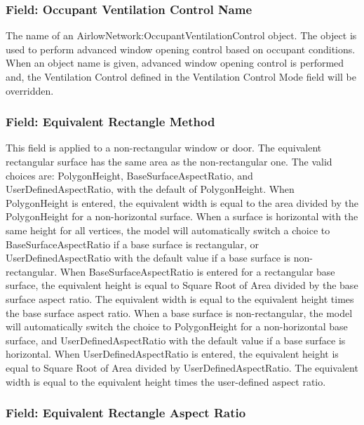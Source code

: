 \subsubsection{Field: Occupant Ventilation Control Name}\label{field-occupant-ventilation-control-name-1}

The name of an AirlowNetwork:OccupantVentilationControl object. The object is used to perform advanced window opening control based on occupant conditions. When an object name is given, advanced window opening control is performed and, the Ventilation Control defined in the Ventilation Control Mode field will be overridden.

\subsubsection{Field: Equivalent Rectangle Method }\label{equivalent-rectangle-method}

This field is applied to a non-rectangular window or door. The equivalent
rectangular surface has the same area as the non-rectangular one. The valid
choices are: PolygonHeight, BaseSurfaceAspectRatio, and UserDefinedAspectRatio,
with the default of PolygonHeight. When PolygonHeight is entered, the equivalent
width is equal to the area divided by the PolygonHeight for a non-horizontal
surface. When a surface is horizontal with the same height for all vertices,
the model will automatically switch a choice to BaseSurfaceAspectRatio if a
base surface is rectangular, or UserDefinedAspectRatio with the default value if
a base surface is non-rectangular.  When BaseSurfaceAspectRatio is entered for
a rectangular base surface, the equivalent height is equal to Square Root of
Area divided by the base surface aspect ratio. The equivalent width is equal
to the equivalent height times the base surface aspect ratio. When a base
surface is non-rectangular, the model will automatically switch the choice to
PolygonHeight for a non-horizontal base surface, and UserDefinedAspectRatio
with the default value if a base surface is horizontal. When
UserDefinedAspectRatio is entered, the equivalent height is equal to Square
Root of Area divided by UserDefinedAspectRatio. The equivalent width is equal
to the equivalent height times the user-defined aspect ratio.

 \subsubsection{Field: Equivalent Rectangle Aspect Ratio}\label{equivalent-rectangular-aspect-ratio}

